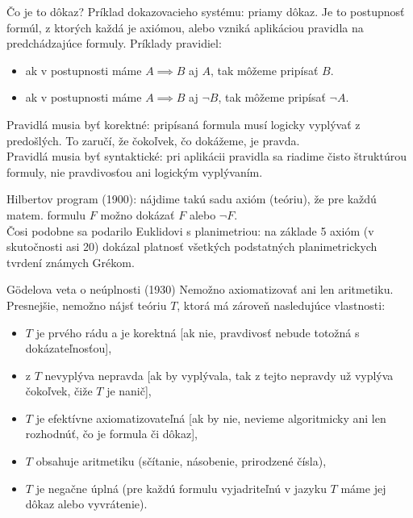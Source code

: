 \documentclass[12pt]{beamer}
\theoremstyle{definition}
\begin{document}
\begin{frame}{Čo je to dôkaz?}
Príklad dokazovacieho systému: priamy dôkaz. Je to postupnosť formúl, z ktorých každá je axiómou, alebo vzniká aplikáciou pravidla na predchádzajúce formuly.
Príklady pravidiel:
\begin{itemize}
\item ak v postupnosti máme $A\implies B$ aj $A$, tak môžeme pripísať $B$.
\item ak v postupnosti máme $A\implies B$ aj $\lnot B$, tak môžeme pripísať $\lnot A$.
\end{itemize}

Pravidlá musia byť \alert{korektné}: pripísaná formula musí logicky vyplývať z predošlých. To zaručí, že čokoľvek, čo dokážeme, je pravda.\\[3mm]

Pravidlá musia byť \alert{syntaktické}: pri aplikácii pravidla sa riadime čisto štruktúrou formuly, nie pravdivosťou ani logickým vyplývaním.
\end{frame}

\begin{frame}
Hilbertov program (1900):
nájdime takú sadu axióm (teóriu), že pre každú matem. formulu $F$ možno dokázať $F$ alebo $\lnot F$.\\[5mm]
Čosi podobne sa podarilo Euklidovi s planimetriou: na základe 5 axióm (v skutočnosti asi 20)
dokázal platnosť všetkých podstatných planimetrickych tvrdení známych Grékom.
\end{frame}

\begin{frame}{G\"odelova veta o neúplnosti (1930)}
Nemožno axiomatizovať ani len aritmetiku.
Presnejšie, nemožno nájsť teóriu $T$, ktorá má zároveň nasledujúce vlastnosti:
\begin{itemize}
\item $T$ je prvého rádu a je korektná [ak nie, pravdivosť nebude totožná s dokázateľnosťou],
\item z $T$ nevyplýva nepravda [ak by vyplývala, tak z tejto nepravdy už vyplýva čokoľvek, čiže $T$ je nanič],
\item $T$ je efektívne axiomatizovateľná [ak by nie, nevieme algoritmicky ani len rozhodnúť, čo je formula či dôkaz],
\item $T$ obsahuje aritmetiku (sčítanie, násobenie, prirodzené čísla),
\item $T$ je negačne úplná (pre každú formulu vyjadriteľnú v jazyku $T$ máme jej dôkaz alebo vyvrátenie).
\end{itemize}
\end{frame}
\end{document}
